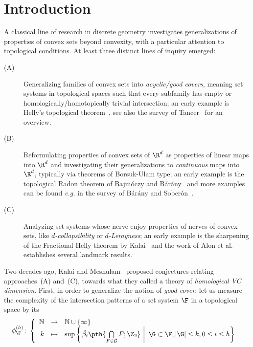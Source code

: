 \section{Introduction}
%
A classical line of research in discrete geometry investigates generalizations of properties of convex sets beyond convexity, with a particular attention to topological conditions. At least three distinct lines of inquiry emerged:
%
\begin{description}
\item[(A)] Generalizing families of convex sets into \emph{acyclic/good covers}, meaning set systems in topological spaces such that every subfamily has empty or homologically/homotopically trivial intersection; an early example is Helly's topological theorem~\cite{helly1930systeme}, see also the survey of Tancer~\cite{tancer2012intersection} for an overview.\medskip
%
\item[(B)] Reformulating properties of convex sets of $\R^d$ as properties of linear maps into $\R^d$ and investigating their generalizations to \emph{continuous} maps into $\R^d$, typically via theorems of Borsuk-Ulam type; an early example is the topological Radon theorem of Bajmóczy and Bárány~\cite{bajmoczy1979common} and more examples can be found \emph{e.g.} in the survey of Bárány and Soberón~\cite{barany2018tverberg}.\medskip
%
\item[(C)] Analyzing set systems whose nerve enjoy properties of nerves of convex sets, like \emph{$d$-collapsibility} or \emph{$d$-Lerayness}; an early example is the sharpening of the Fractional Helly theorem by Kalai~\cite{kalai1984intersection} and the work of Alon et al.~\cite{transversal-hypergraph} establishes several landmark results.
\end{description}
%
\noindent
Two decades ago, Kalai and Meshulam~\cite{KM} proposed conjectures relating approaches~(A) and~(C), towards what they called a theory of \emph{homological VC dimension}. First, in order to generalize the notion of \emph{good cover}, let us measure the complexity of the intersection patterns of a set system $\F$ in a topological space by its 
%
\begin{equation}\label{eq:homshat}
  \phi_{\F}^{(h)}\colon\left\{\begin{array}{rcl}
        \mathbb{N} & \rightarrow & \mathbb{N} \cup \{\infty\} \\
         k& \mapsto & \sup \left\{\left.\tilde{\beta_i}\pth{\bigcap\limits_{F\in \mathcal{G}} F;\Z_2} \ \right| \ \G\subset \F, |\G|\leq k, 0\leq i\leq h\right\}.
    \end{array}\right.
\end{equation}
